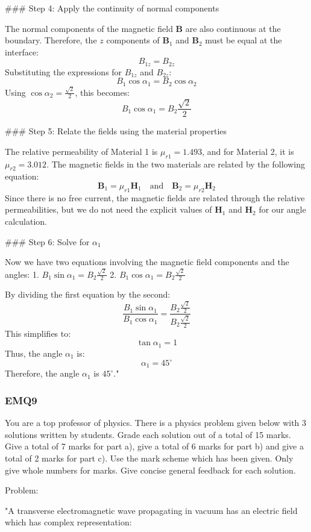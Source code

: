 ### Step 4: Apply the continuity of normal components

The normal components of the magnetic field $\mathbf{B}$ are also continuous at the boundary. Therefore, the $z$ components of $\mathbf{B}_1$ and $\mathbf{B}_2$ must be equal at the interface:
\[
B_{1z} = B_{2z}
\]
Substituting the expressions for $B_{1z}$ and $B_{2z}$:
\[
B_1 \cos \alpha_1 = B_2 \cos \alpha_2
\]
Using $\cos \alpha_2 = \frac{\sqrt{2}}{2}$, this becomes:
\[
B_1 \cos \alpha_1 = B_2 \frac{\sqrt{2}}{2}
\]

### Step 5: Relate the fields using the material properties

The relative permeability of Material 1 is $\mu_{r1} = 1.493$, and for Material 2, it is $\mu_{r2} = 3.012$. The magnetic fields in the two materials are related by the following equation:
\[
\mathbf{B}_1 = \mu_{r1} \mathbf{H}_1 \quad \text{and} \quad \mathbf{B}_2 = \mu_{r2} \mathbf{H}_2
\]
Since there is no free current, the magnetic fields are related through the relative permeabilities, but we do not need the explicit values of $\mathbf{H}_1$ and $\mathbf{H}_2$ for our angle calculation.

### Step 6: Solve for $\alpha_1$

Now we have two equations involving the magnetic field components and the angles:
1. \( B_1 \sin \alpha_1 = B_2 \frac{\sqrt{2}}{2} \)
2. \( B_1 \cos \alpha_1 = B_2 \frac{\sqrt{2}}{2} \)

By dividing the first equation by the second:
\[
\frac{B_1 \sin \alpha_1}{B_1 \cos \alpha_1} = \frac{B_2 \frac{\sqrt{2}}{2}}{B_2 \frac{\sqrt{2}}{2}}
\]
This simplifies to:
\[
\tan \alpha_1 = 1
\]
Thus, the angle $\alpha_1$ is:
\[
\alpha_1 = 45^\circ
\]
Therefore, the angle $\alpha_1$ is $45^\circ$."

\subsubsection{EMQ9}

You are a top professor of physics. There is a physics problem given below with 3 solutions written by students. Grade each solution out of a total of 15 marks. Give a total of 7 marks for part a), give a total of 6 marks for part b) and give a total of 2 marks for part c). Use the mark scheme which has been given. Only give whole numbers for marks. Give concise general feedback for each solution. 

Problem:

"A transverse electromagnetic wave propagating in vacuum has an electric field which has complex representation:

